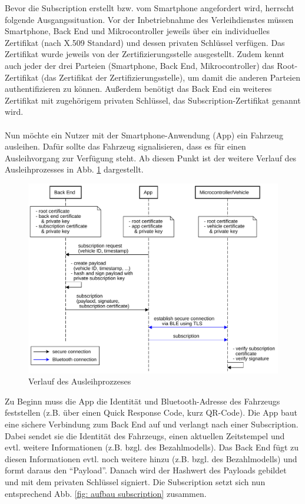 Bevor die Subscription erstellt bzw. vom Smartphone angefordert wird, herrscht folgende Ausgangssituation. Vor der Inbetriebnahme des Verleihdienstes müssen Smartphone, Back End und Mikrocontroller jeweils über ein individuelles Zertifikat (nach X.509 Standard) und dessen privaten Schlüssel verfügen. Das Zertifikat wurde jeweils von der Zertifizierungsstelle ausgestellt. Zudem kennt auch jeder der drei Parteien (Smartphone, Back End, Mikrocontroller) das Root-Zertifikat (das Zertifikat der Zertifizierungsstelle), um damit die anderen Parteien authentifizieren zu können. Außerdem benötigt das Back End ein weiteres Zertifikat mit zugehörigem privaten Schlüssel, das Subscription-Zertifikat genannt wird.
\\\\
Nun möchte ein Nutzer mit der Smartphone-Anwendung (App) ein Fahrzeug ausleihen. Dafür sollte das Fahrzeug signalisieren, dass es für einen Ausleihvorgang zur Verfügung steht. Ab diesen Punkt ist der weitere Verlauf des Ausleihprozesses in Abb. \ref{fig: verlauf ausleihprozess} dargestellt.
\begin{figure}[H]
    \centering
    \includegraphics[width=1\textwidth]{graphics/verlauf_ausleihprozess.pdf}
    \caption[Verlauf des Ausleihprozzeses]{Verlauf des Ausleihprozzeses}
    \label{fig: verlauf ausleihprozess}
\end{figure}
Zu Beginn muss die App die Identität und Bluetooth-Adresse des Fahrzeugs feststellen (z.B. über einen Quick Response Code, kurz QR-Code). Die App baut eine sichere Verbindung zum Back End auf und verlangt nach einer Subscription. Dabei sendet sie die Identität des Fahrzeugs, einen aktuellen Zeitstempel und evtl. weitere Informationen (z.B. bzgl. des Bezahlmodells). Das Back End fügt zu diesen Informationen evtl. noch weitere hinzu (z.B. bzgl. des Bezahlmodells) und formt daraus den "`Payload"'. Danach wird der Hashwert des Payloads gebildet und mit dem privaten Schlüssel signiert. Die Subscription setzt sich nun entsprechend Abb. \ref{fig: aufbau subscription} zusammen.
